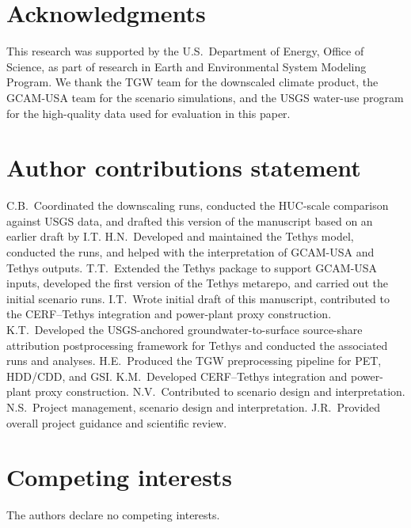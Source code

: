 \documentclass[fleqn,10pt]{wlscirep}
\begin{document}
\section*{Acknowledgments}

This research was supported by the U.S.~Department of Energy, Office of Science, as part of research in Earth and Environmental System Modeling Program. We thank the TGW team for the downscaled climate product, the GCAM-USA team for the scenario simulations, and the USGS water-use program for the high-quality data used for evaluation in this paper.

\section*{Author contributions statement}

C.B.~Coordinated the downscaling runs, conducted the HUC-scale comparison against USGS data, and drafted this version of the manuscript based on an earlier draft by I.T.
H.N.~Developed and maintained the Tethys model, conducted the runs, and helped with the interpretation of GCAM-USA and Tethys outputs.
T.T.~Extended the Tethys package to support GCAM-USA inputs, developed the first version of the Tethys metarepo, and carried out the initial scenario runs.
I.T.~Wrote initial draft of this manuscript, contributed to the CERF--Tethys integration and power-plant proxy construction.
K.T.~Developed the USGS-anchored groundwater-to-surface source-share attribution postprocessing framework for Tethys and conducted the associated runs and analyses.
H.E.~Produced the TGW preprocessing pipeline for PET, HDD/CDD, and GSI.
K.M.~Developed CERF--Tethys integration and power-plant proxy construction.
N.V.~Contributed to scenario design and interpretation.
N.S.~Project management, scenario design and interpretation.
J.R.~Provided overall project guidance and scientific review.

\section*{Competing interests}

The authors declare no competing interests.


\end{document}
